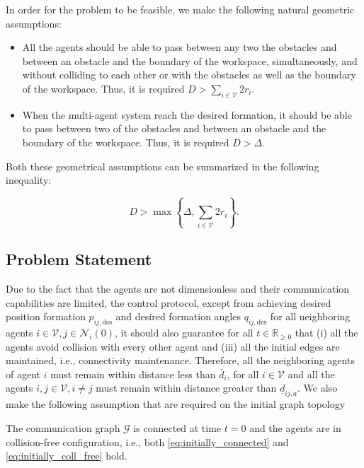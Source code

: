 \begin{assumption}
	In order for the problem to be feasible, we make the following natural
  geometric assumptions:

	\begin{itemize}
		\item All the agents should be able to pass between any two the obstacles
      and between an obstacle and the boundary of the workspace, simultaneously,
      and without colliding to each other or with the obstacles as well as the
      boundary of the workspace.
      Thus, it is required $D >  \sum_{i \in \mathcal{V}}^{} 2 r_i$.
		\item When the multi-agent system reach the desired formation, it should be
      able to pass between two of the obstacles and between an obstacle and the
      boundary of the workspace. Thus, it is required $D > \Delta$.
	\end{itemize}

	Both these geometrical assumptions can be summarized in the following
  inequality:

	\begin{equation} \label{eq:geometric_constraint}
	D > \max\left\{\Delta, \sum_{i \in \mathcal{V}}^{} 2 r_i \right\}.
	\end{equation}

\end{assumption}

\subsection{Problem Statement}
Due to the fact that the agents are not dimensionless and their communication
capabilities are limited, the control protocol, except from achieving desired
position formation $p_{ij, \text{des}}$ and desired formation angles
$q_{ij, \text{des}}$ for all neighboring agents
$i \in \mathcal{V}, j \in \mathcal{N}_i(0)$, it should also guarantee for
all $t\in\mathbb{R}_{\geq 0}$ that (i) all the agents avoid collision with
every other agent and (iii) all the initial edges are maintained, i.e.,
connectivity maintenance. Therefore, all the neighboring agents of agent $i$
must remain within distance less than $\bar{d}_{i}$, for all $i \in \mathcal{V}$
and all the agents $i, j\in \mathcal{V}, i \neq j$ must remain within distance
greater than $\underline{d}_{ij,a}$. We also make the following assumption that
are required on the initial graph topology

\begin{assumption}
	The communication graph $\mathcal{G}$ is connected at time $t = 0$ and the
  agents are in collision-free configuration, i.e.,
  both \eqref{eq:initially_connected} and \eqref{eq:initially_coll_free} hold.
\end{assumption}

